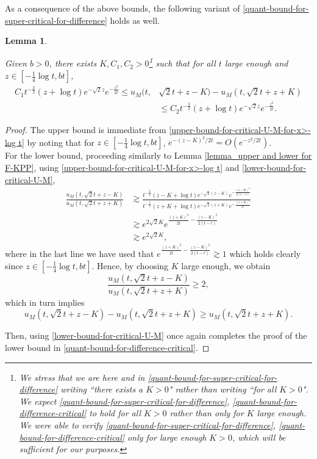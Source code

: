 \documentclass[a4paper,reqno]{amsart}%
\newcommand{\1}{\mathbf 1}
\theoremstyle{mine}
\numberwithin{theorem}{section}
\newtheorem{lemma}[theorem]{Lemma}
\numberwithin{equation}{section}
\theoremstyle{remark}
\begin{document}
As a consequence of the above bounds, the following variant of \eqref{quant-bound-for-super-critical-for-difference} holds as well. 

\begin{lemma}\label{Lemma-on-difference-U_M-for-critical}

Given $b>0$, there exists $K, C_1, C_2>0$\footnote{We stress that we are here and in \eqref{quant-bound-for-super-critical-for-difference} writing ``there exists a $K>0$" rather than writing ``for all $K>0$". We expect \eqref{quant-bound-for-super-critical-for-difference}, \eqref{quant-bound-for-difference-critical} to hold for all $K>0$ rather than only for $K$ large enough. We were able to verify \eqref{quant-bound-for-super-critical-for-difference}, \eqref{quant-bound-for-difference-critical} only for large enough $K>0$, which will be sufficient for our purposes.} such that for all $t$ large enough and $z\in [-\frac{1}{4}\log t , b t]$,
    \begin{align}\label{quant-bound-for-difference-critical}
        C_1 t^{-\frac{3}{2}} (z+\log t)e^{-\sqrt 2 z}e^{-\frac{z^2}{2t}}\le u_M(t,  &\sqrt{2}t + z - K ) - u_M(t, \sqrt{2}t + z + K ) \\ \nonumber & \le C_2 t^{-\frac{3}{2}} (z+\log t)e^{-\sqrt 2 z}e^{-\frac{z^2}{2t}}.
    \end{align}
    
\end{lemma}


\begin{proof}
    The upper bound is immediate from \eqref{upper-bound-for-critical-U-M-for-x>-log t} by noting that for $z\in [-\frac{1}{4}\log t , b t]$, $e^{-(z-K)^2/2t} = O(e^{-z^2/2t})$.\\
    For the lower bound, proceeding similarly to Lemma \ref{lemma_upper and lower for F-KPP}, using \eqref{upper-bound-for-critical-U-M-for-x>-log t} and \eqref{lower-bound-for-critical-U-M},
    \begin{align*}
          \frac{u_M(t,\sqrt 2t+z-K)}{u_M(t,\sqrt 2t+z + K)} &\gtrsim \frac{t^{-\frac{3}{2}} (z -K +\log t)e^{-\sqrt 2 (z-K)}e^{-\frac{(z-K)^2}{2(t-r)}}}{t^{-\frac{3}{2}} (z+ K + \log t)e^{-\sqrt 2(z+K)}e^{-\frac{(z+K)^2}{2t}}} \\
          & \gtrsim e^{2\sqrt 2K} e^{\frac{(z+K)^2}{2t}- \frac{(z-K)^2}{2(t-r)}} \\& 
          \gtrsim e^{2\sqrt 2K}, 
     \end{align*}
     where in the last line we have used that $e^{\frac{(z+K)^2}{2t}- \frac{(z-K)^2}{2(t-r)}} \gtrsim 1 $ which holds clearly since $z\in [-\frac{1}{4}\log t , b t]$. Hence, by choosing $K$ large enough, we obtain 
     \[ \frac{u_M(t,\sqrt 2t+z-K)}{u_M(t,\sqrt 2t+z + K)} \geq 2,\]
     which in turn implies 
     \[u_M(t,\sqrt 2t+z-K) - u_M(t,\sqrt 2t+z + K) \geq u_M(t,\sqrt 2t+z + K).\]

    Then, using \eqref{lower-bound-for-critical-U-M} once again completes the proof of the lower bound in \eqref{quant-bound-for-difference-critical}.
\end{proof}
 
\end{document}
